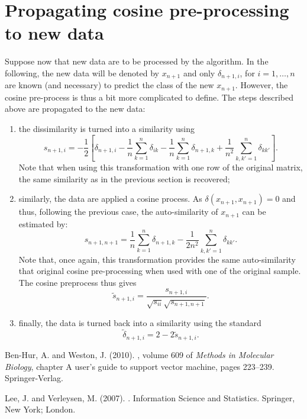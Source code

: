 \documentclass[a4paper,10pt]{scrartcl}
\begin{document}
\section{Propagating cosine pre-processing to new data}

Suppose now that new data are to be processed by the algorithm. In the
following, the new data will be denoted by $x_{n+1}$ and only $\delta_{n+1,i}$,
for $i=1,\ldots,n$ are known (and necessary) to predict the class of the new
$x_{n+1}$. However, the cosine pre-process is thus a bit more complicated to
define. The steps described above are propagated to the new data:
\begin{enumerate}
	\item the dissimilarity is turned into a similarity using
	\[
		s_{n+1,i} = -\frac{1}{2} \left[\delta_{n+1,i} -\frac{1}{n} \sum_{k=1}^n
\delta_{ik} - \frac{1}{n} \sum_{k=1}^n \delta_{n+1,k} + \frac{1}{n^2}
\sum_{k,k'=1}^n \delta_{kk'}\right].
	\]
	Note that when using this transformation with one row of the original matrix,
the same similarity as in the previous section is recovered;
	\item similarly, the data are applied a cosine process. As
$\delta(x_{n+1},x_{n+1})=0$ and thus, following the previous case, the
auto-similarity of $x_{n+1}$ can be estimated by:
	\[
		s_{n+1,n+1} = \frac{1}{n} \sum_{k=1}^n \delta_{n+1,k} - \frac{1}{2n^2}
\sum_{k,k'=1}^n \delta_{kk'}.
	\]
	Note that, once again, this transformation provides the same auto-similarity
that original cosine pre-processing when used with one of the original sample.
The cosine preprocess thus gives
	\[
		\tilde{s}_{n+1,i} = \frac{s_{n+1,i}}{\sqrt{s_{ii}} \sqrt{s_{n+1,n+1}}}.
	\]
	\item finally, the data is turned back into a similarity using the standard
	\[
		\tilde{\delta}_{n+1,i} = 2-2\tilde{s}_{n+1,i}.
	\]
\end{enumerate}


% 
% 

\begin{thebibliography}{}

Ben-Hur, A. and Weston, J. (2010).
, volume 609 of
  {\em Methods in Molecular Biology}, chapter A user's guide to support vector
  machine, pages 223--239.
\newblock Springer-Verlag.

Lee, J. and Verleysen, M. (2007).
.
\newblock Information Science and Statistics. Springer, New York; London.

\end{thebibliography}
\end{document}
